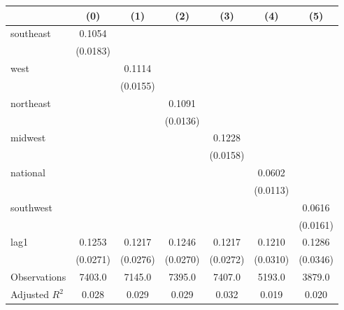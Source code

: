 \begin{tabular}{lcccccc}
\toprule
 & (0) & (1) & (2) & (3) & (4) & (5) \\
\midrule
southeast & 0.1054 &  &  &  &  &  \\
\vspace{0.2cm}
 & (0.0183) &  &  &  &  &  \\
west &  & 0.1114 &  &  &  &  \\
\vspace{0.2cm}
 &  & (0.0155) &  &  &  &  \\
northeast &  &  & 0.1091 &  &  &  \\
\vspace{0.2cm}
 &  &  & (0.0136) &  &  &  \\
midwest &  &  &  & 0.1228 &  &  \\
\vspace{0.2cm}
 &  &  &  & (0.0158) &  &  \\
national &  &  &  &  & 0.0602 &  \\
\vspace{0.2cm}
 &  &  &  &  & (0.0113) &  \\
southwest &  &  &  &  &  & 0.0616 \\
\vspace{0.2cm}
 &  &  &  &  &  & (0.0161) \\
lag1 & 0.1253 & 0.1217 & 0.1246 & 0.1217 & 0.1210 & 0.1286 \\
\vspace{0.2cm}
 & (0.0271) & (0.0276) & (0.0270) & (0.0272) & (0.0310) & (0.0346) \\
\midrule
Observations & 7403.0 & 7145.0 & 7395.0 & 7407.0 & 5193.0 & 3879.0 \\
Adjusted $R^2$ & 0.028 & 0.029 & 0.029 & 0.032 & 0.019 & 0.020 \\
\bottomrule
\end{tabular}